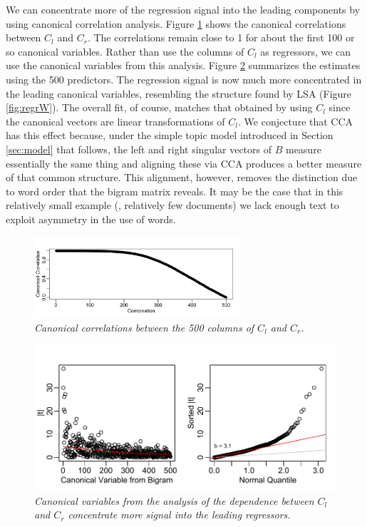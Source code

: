 \documentclass[12pt]{article}
\begin{document}
We can concentrate more of the regression signal into the leading components by using canonical correlation analysis.  Figure \ref{fig:cca} shows the canonical correlations between  $C_l$ and $C_r$.  The correlations remain close to 1 for about the first 100 or so canonical variables.  Rather than use the columns of $C_l$ as regressors, we can use the canonical variables from this analysis.  Figure \ref{fig:regrBcca} summarizes the estimates using the 500 predictors.  The regression signal is now much more concentrated in the leading canonical variables, resembling the structure found by LSA (Figure \ref{fig:regrW}).  The overall fit, of course, matches that obtained by using $C_l$ since the canonical vectors are linear transformations of $C_l$.  We conjecture that CCA has this effect because, under the simple topic model introduced in Section \ref{sec:model} that follows, the left and right singular vectors of $B$ measure essentially the same thing and aligning these via CCA produces a better measure of that common structure.  This alignment, however, removes the distinction due to word order that the bigram matrix reveals.  It may be the case that in this relatively small example (\ie, relatively few documents) we lack enough text to exploit asymmetry in the use of words.
 
 
 \begin{figure}
 \caption{ \label{fig:cca} { \sl Canonical correlations between the 500 columns of $C_l$ and $C_r$.}}

 \centerline{
 \vspace{0.1in}
 \includegraphics[width=3in]{figures/cca}  }
 \vspace{0.2in}
 \end{figure}


 \begin{figure}
 \caption{ \label{fig:regrBcca} { \sl Canonical variables from the analysis of the dependence between $C_l$ and $C_r$ concentrate more signal into the leading regressors.}}

 \centerline{
 \vspace{0.1in}
 \includegraphics[width=5in]{figures/regrBcca}  }
 \vspace{0.2in}
 \end{figure}
\end{document}
